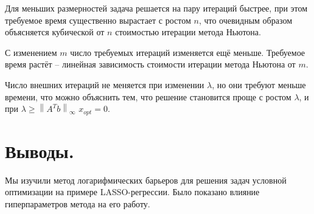 \documentclass[11pt]{article}
\begin{document}
Для меньших размерностей задача решается на пару итераций быстрее, при этом требуемое время существенно вырастает с ростом $n$, что очевидным образом объясняется кубической от $n$ стоимостью итерации метода Ньютона. 

С изменением $m$ число требуемых итераций изменяется ещё меньше.
Требуемое время растёт -- линейная зависимость стоимости итерации метода Ньютона от $m$.

Число внешних итераций не меняется при изменении $\lambda$, но они требуют меньше времени, что можно объяснить тем, что решение становится проще с ростом $\lambda$, и при $\lambda \geq\left\|A^{T} b\right\|_{\infty}$  $x_{opt} = 0$.

\section{Выводы.}
Мы изучили метод логарифмических барьеров для решения задач условной оптимизации на примере LASSO-регрессии. Было показано влияние гиперпараметров метода на его работу.
\end{document}
